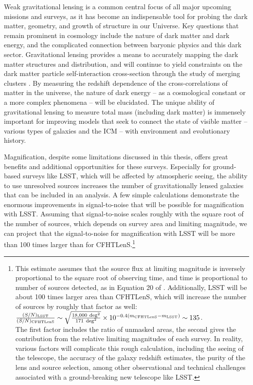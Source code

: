 Weak gravitational lensing is a common central focus of all major upcoming missions and surveys, as it has become an indispensable tool for probing the dark matter, geometry, and growth of structure in our Universe. Key questions that remain prominent in cosmology include the nature of dark matter and dark energy, and the complicated connection between baryonic physics and this dark sector. Gravitational lensing provides a means to accurately mapping the dark matter structures and distribution, and will continue to yield constraints on the dark matter particle self-interaction cross-section through the study of merging clusters \citep{DawsonThesis13,WittmanProposal13}. By measuring the redshift dependence of the cross-correlations of matter in the universe, the nature of dark energy -- as a cosmological constant or a more complex phenomena -- will be elucidated. The unique ability of gravitational lensing to measure total mass (including dark matter) is immensely important for improving models that seek to connect the state of visible matter -- various types of galaxies and the \ac{ICM} -- with environment and evolutionary history.

Magnification, despite some limitations discussed in this thesis, offers great benefits and additional opportunities for these surveys. Especially for ground-based surveys like \ac{LSST}, which will be affected by atmospheric seeing, the ability to use unresolved sources increases the number of gravitationally lensed galaxies that can be included in an analysis. A few simple calculations demonstrate the enormous improvements in signal-to-noise that will be possible for magnification with \ac{LSST}. Assuming that signal-to-noise scales roughly with the square root of the number of sources, which depends on survey area and limiting magnitude, we can project that the signal-to-noise for magnification with \ac{LSST} will be more than 100 times larger than for \ac{CFHTLenS}.\footnote{This estimate assumes that the source flux at limiting magnitude is inversely proportional to the square root of observing time, and time is proportional to number of sources detected, as in Equation 20 of \citet{Chang13}. Additionally, \ac{LSST} will be about 100 times larger area than \ac{CFHTLenS}, which will increase the number of sources by roughly that factor as well: \\ $\frac{(S/N)_{\rm LSST}}{(S/N)_{\rm CFHTLenS}} \sim \sqrt{\frac{18,000\ {\rm deg}^2}{171\ {\rm deg}^2}} \times 10^{-0.4(m_{\rm CFHTLenS} - m_{\rm LSST})} \sim 135$.\\ The first factor includes the ratio of unmasked areas, the second gives the contribution from the relative limiting magnitudes of each survey. In reality, various factors will complicate this rough calculation, including the seeing of the telescope, the accuracy of the galaxy redshift estimates, the purity of the lens and source selection, among other observational and technical challenges associated with a ground-breaking new telescope like \ac{LSST}.}


